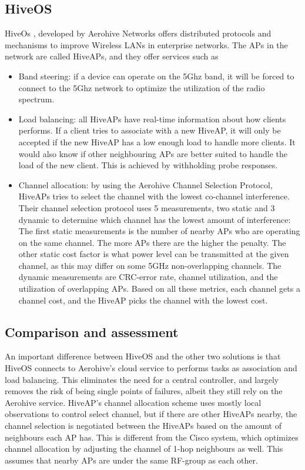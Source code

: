 \subsection{HiveOS}
HiveOs \cite{Aerohive}, developed by Aerohive Networks offers distributed protocols and mechanisms to improve Wireless LANs in enterprise networks. The APs 
in the network are called HiveAPs, and they offer services such as
\begin{itemize}
	\item Band steering: if a device can operate on the 5Ghz band, it will be forced to connect to the 5Ghz network to optimize the utilization of the radio spectrum. 
	\item Load balancing: all HiveAPs have real-time information about how clients performs. If a client tries to associate with a new HiveAP, it will only be accepted
				if the new HiveAP has a low enough load to handle more clients. It would also know if other neighbouring APs are better suited to handle the load of the new client.
				This is achieved by withholding probe responses.

	\item Channel allocation: by using the Aerohive Channel Selection Protocol, HiveAPs tries to select the channel with the lowest co-channel interference. Their channel selection protocol uses 5 measurements, two static and 3 dynamic to determine which channel has the lowest amount of interference:
	The first static measurements is the number of nearby APs who are operating on the same channel. The more APs there are the higher the penalty.
		The other static cost factor is what power level can be transmitted at the given channel, as this may differ on some 5GHz non-overlapping channels.
		The dynamic measurements are CRC-error rate, channel utilization, and the utilization of overlapping APs. 
		Based on all these metrics, each channel gets a channel cost, and the HiveAP picks the channel with the lowest cost. 


\end{itemize}
\subsection{Comparison and assessment}
		An important difference between HiveOS and the other two solutions is that HiveOS connects to Aerohive's cloud service to performs tasks as association and load balancing.
		This eliminates the need for a central controller, and largely removes the risk of being single points of failures, albeit they still rely on the Aerohive service. 
		HiveAP's channel allocation scheme uses mostly local observations to control select channel, but if there are other HiveAPs nearby, the channel selection is negotiated between the HiveAPs
		based on the amount of neighbours each AP has. This is different from the Cisco system, which optimizes channel allocation by adjusting the channel of 1-hop neighbours as well. This
		assumes that nearby APs are under the same RF-group as each other.

